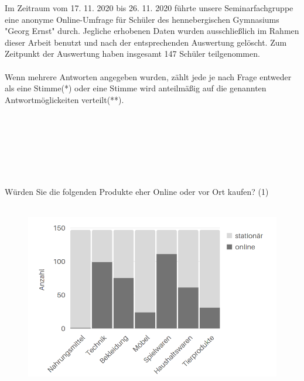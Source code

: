\normalsize
Im Zeitraum vom 17. 11. 2020 bis 26. 11. 2020 führte unsere Seminarfachgruppe eine anonyme Online-Umfrage für Schüler des hennebergischen Gymnasiums "Georg Ernst" durch. Jegliche erhobenen Daten wurden ausschließlich im Rahmen dieser Arbeit benutzt und nach der entsprechenden Auswertung gelöscht. Zum Zeitpunkt der Auswertung haben insgesamt 147 Schüler teilgenommen.\\\\
Wenn mehrere Antworten angegeben wurden, zählt jede je nach Frage entweder als eine Stimme(*) oder eine Stimme wird anteilmäßig auf die genannten Antwortmöglickeiten verteilt(**).\\\\\\\\\\\\\\\\



Würden Sie die folgenden Produkte eher Online oder vor Ort kaufen? (1)\\\\
\begin{figure}[H]
    \begin{center}
        \includegraphics[width=12.5cm]{media/schuelerumfrage/1.png}
    \end{center}
\end{figure} 



